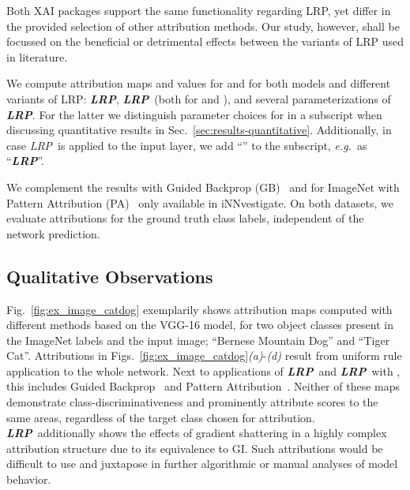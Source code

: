 \documentclass[conference]{IEEEtran}
\def\eg{\emph{e.g.~}}
\newcommand{\lrpz}[0]{\emph{LRP}}
\newcommand{\LRPZ}[0]{\textbf{\lrpz}}
\newcommand{\lrpalphabeta}[0]{\emph{LRP}}
\newcommand{\LRPALPHABETA}[0]{\textbf{\lrpalphabeta}}
\newcommand{\lrpflat}[0]{\emph{LRP}}
\newcommand{\lrpcnn}[0]{\emph{LRP}}
\newcommand{\LRPCMP}[0]{\textbf{\lrpcnn}}
\newcommand{\lrpcnnalphaonebetazeroflat}[0]{\emph{LRP}}
\newcommand{\LRPCNNALPHAONEBETAZEROFLAT}[0]{\textbf{\lrpcnnalphaonebetazeroflat}}
\begin{document}
Both XAI packages support the same functionality regarding LRP, yet differ in the provided selection of other attribution methods.
Our study, however, shall be focussed on the beneficial or detrimental effects between the variants of LRP used in literature.

We compute attribution maps
and values for  and 
for both models and
different variants of LRP: \LRPZ,
\LRPALPHABETA~(both for  and ),
and
several parameterizations of \LRPCMP.
For the latter we distinguish parameter choices for  in a subscript when discussing quantitative results in Sec.~\ref{sec:results-quantitative}.
Additionally, in case \lrpflat~is applied to the input layer, we add ``'' to the subscript, \eg as ``\LRPCNNALPHAONEBETAZEROFLAT''.

We complement the results with
Guided Backprop (GB)~\cite{springenberg2014striving} and
for ImageNet with
Pattern Attribution (PA)~\cite{kindermans2017learning} only available in iNNvestigate.
On both datasets, we evaluate attributions for the ground truth class labels, independent of the network prediction.



\subsection{Qualitative Observations}
\label{sec:results-qualitative}


Fig.~\ref{fig:ex_image_catdog} exemplarily shows attribution maps computed with different methods based on the VGG-16 model, for two object classes present in the ImageNet labels and the input image; ``Bernese Mountain Dog'' and ``Tiger Cat''.
Attributions in \mbox{Figs.~\ref{fig:ex_image_catdog}\emph{(a)}-\emph{(d)}} result from uniform rule application to the whole network.
Next to applications of \LRPZ~and \LRPALPHABETA~with \mbox{}, this includes Guided Backprop~\cite{springenberg2014striving} and Pattern Attribution~\cite{kindermans2017learning}.
Neither of these maps demonstrate class-discriminativeness and prominently attribute scores to the same areas, regardless of the target class chosen for attribution.
\LRPZ~additionally shows the effects of gradient shattering in a highly complex attribution structure due to its equivalence to GI.
Such attributions would be difficult to use and juxtapose in further algorithmic or manual analyses of model behavior.
\end{document}
